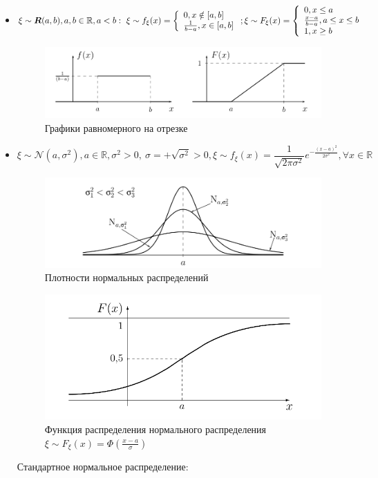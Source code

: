 \begin{defs}
	\begin{itemize}
		\item {}

		\begin{gather*}
			\xi \sim \boldsymbol{R}(a,b), a,b \in \mathbb{R}, a < b: \ \xi \sim f_{\xi}(x) = \left\{\begin{array}{l} 0 , x \notin [a,b] \\ \frac{1}{b-a}, x \in [a,b] \end{array}\right.; \xi \sim F_{\xi}(x) = \left\{\begin{array}{l} 	0 , x \leq a \\ \frac{x-a}{b-a}, a \leq x \leq b \\ 1 , x \geq b \end{array}\right.
		\end{gather*}
		\begin{figure}[H]
		      \centering
		      \includegraphics[width=0.8\linewidth]{img/ravnom1.png}
		      \caption{Графики равномерного на отрезке}
		\end{figure}
		\item {}

		$$\xi \sim \mathcal{N}(a,\sigma^{2}), a \in \mathbb{R}, \sigma^{2} > 0, \ \sigma = +\sqrt{\sigma^{2}} > 0, \xi \sim f_{\xi}(x) = \frac{1}{\sqrt{2\pi\sigma^{2}}}e^{-\frac{(x-a)^{2}}{2\sigma^{2}}}, \forall x \in \mathbb{R}$$

		\begin{figure}[H]
		      \centering
		      \includegraphics[width=0.8\linewidth]{img/plotnorm.png}
		      \caption{Плотности нормальных распределений}
		\end{figure}

		\begin{figure}[H]
		      \centering
		      \includegraphics[width=0.8\linewidth]{img/frnorm.png}
		      \caption{Функция распределения нормального распределения $\xi \sim F_{\xi}(x) = \Phi \left( \frac{x-a}{\sigma} \right)$}
		\end{figure}
		Стандартное нормальное распределение:


\end{itemize}
\end{defs}

